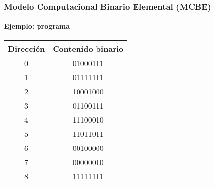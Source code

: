 \documentclass[11pt,a4paper,spanish]{beamer}
\begin{document}
\begin{frame}

    \frametitle{Modelo Computacional Binario Elemental (MCBE)}
    \framesubtitle{Ejemplo: programa}
    \centering
    \begin{tabular}{| c | c |}
        \hline
        \textbf{Dirección}&\textbf{Contenido binario}\\
        \hline \hline
        0 & 01000111 \\
        \hline
        1 & 01111111 \\
        \hline
        2 & 10001000 \\
        \hline
        3 & 01100111 \\
        \hline
        4 & 11100010 \\
        \hline
        5 & 11011011 \\
        \hline
        6 & 00100000 \\
        \hline
        7 & 00000010 \\
        \hline
        8 & 11111111 \\
        \hline
        \hline
\end{tabular}

\end{frame}
\end{document}
